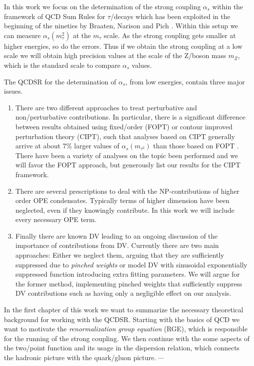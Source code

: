 \documentclass[../../index.tex]{subfiles}
\begin{document}
In this work we focus on the determination of the strong coupling $\alpha_s$
within the framework of QCD Sum Rules for $\tau$\-/decays which has been
exploited in the beginning of the nineties by Braaten, Narison and Pich \cite{Braaten1991}. Within this setup we
can measure $\alpha_s(m_\tau^2)$ at the $m_\tau$ scale. As the strong coupling
gets smaller at higher energies, so do the errors. Thus if we obtain the strong
coupling at a low scale we will obtain high precision values at the scale of the
Z\-/boson mass $m_Z$, which is the standard scale to compare $\alpha_s$ values.

The QCDSR for the determination of $\alpha_s$, from low energies, contain three major issues.
\begin{enumerate}
  \item There are two different approaches to treat perturbative and non\-/perturbative
contributions. In particular, there is a significant difference between results
obtained using fixed\-/order (FOPT) or contour improved perturbation theory
(CIPT), such that analyses based on CIPT generally arrive at about 7\% larger
values of $\alpha_s(m_{\tau^2})$ than those based on FOPT \cite{PDG2018}.
There have been a variety of analyses on the topic been performed
\cite{Pich2013,Caprini2009,Jamin2005} and we will favor the FOPT approach,
but generously list our results for the CIPT framework.

  \item There are several prescriptions to deal with the NP-contributions of
    higher order OPE condensates. Typically terms of higher dimension have been
    neglected, even if they knowingly contribute. In this work we will include
    every necessary OPE term.

  \item Finally there are known DV leading to an ongoing discussion of the
importance of contributions from DV. Currently there are two main approaches:
Either we neglect them, arguing that they are sufficiently suppressed due to
\textit{pinched weights} \cite{Pich2016} or model DV with sinusoidal
exponentially suppressed function \cite{Cata2008,Boito2011,Boito2014} introducing
extra fitting parameters. We will argue for the former method, implementing
pinched weights that sufficiently suppress DV contributions such as having only a negligible effect on our analysis.
\end{enumerate}

In the first chapter of this work we want to summarize the necessary theoretical
background for working with the QCDSR. Starting with the basics of QCD we want to motivate the
\textit{renormalization group equation} (RGE), which is responsible for the
running of the strong coupling. We then continue with the some
aspects of the two\-/point function and its usage in the dispersion relation,
which connects the hadronic picture with the quark\-/gluon picture. $\cdots$
\end{document}
